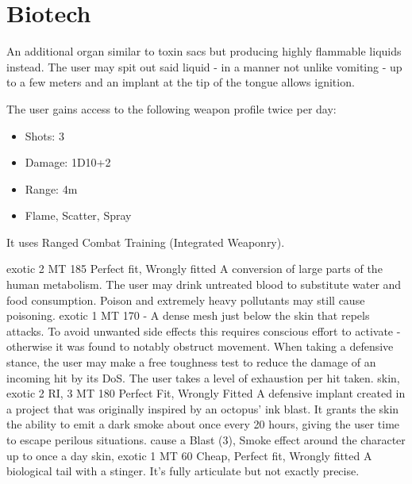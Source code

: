 \documentclass[12pt,a4paper,openany,usenames,dvipsnames]{book}
\begin{document}
    \section{Biotech}
    \vspace{5mm}
    \begin{multicols}{2}
        {An additional organ similar to toxin sacs but producing highly flammable liquids instead. The user may spit out said liquid - in a manner not unlike vomiting - up to a few meters and an implant at the tip of the tongue allows ignition.}
        {The user gains access to the following weapon profile twice per day:
    	\par%
    	\begin{itemize}
    		\item Shots: 3
    		\item Damage: 1D10+2
    		\item Range: 4m
    		\item Flame, Scatter, Spray
    	\end{itemize}
	    It uses Ranged Combat Training (Integrated Weaponry).
        }
        {exotic}
        {2 MT}
        {185}
        {Perfect fit, Wrongly fitted}
        {A conversion of large parts of the human metabolism.}
        {The user may drink untreated blood to substitute water and food consumption. Poison and extremely heavy pollutants may still cause poisoning.}
        {exotic}
        {1 MT}
        {170}
        {-}
    	{A dense mesh just below the skin that repels attacks.
    		To avoid unwanted side effects this requires conscious effort to activate
    		- otherwise it was found to notably obstruct movement.}
    	{When taking a defensive stance, the user may make a free toughness test to reduce the damage of an incoming hit by its DoS. The user takes a level of exhaustion per hit taken.}
    	{skin, exotic}
    	{2 RI, 3 MT}
    	{180}
    	{Perfect Fit, Wrongly Fitted}
        {A defensive implant created in a project that was originally inspired by an octopus' ink blast. It grants the skin the ability to emit a dark smoke about once every 20 hours, giving the user time to escape perilous situations.}
        {cause a Blast (3), Smoke effect around the character up to once a day}
        {skin, exotic}
        {1 MT}
        {60}
        {Cheap, Perfect fit, Wrongly fitted}
        {A biological tail with a stinger. It's fully articulate but not exactly precise.}

\end{multicols}
\end{document}
